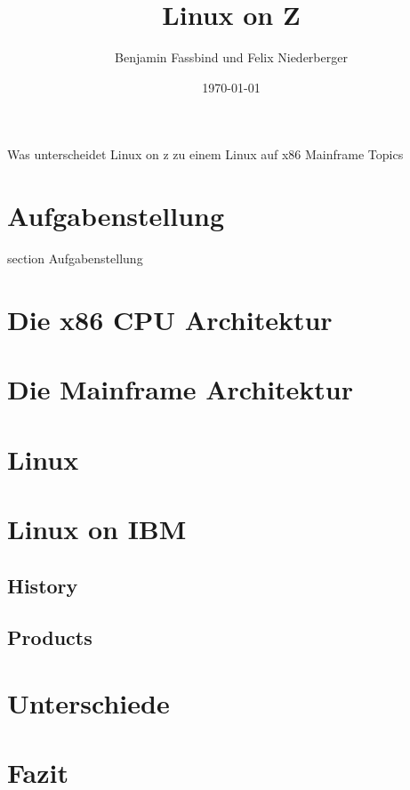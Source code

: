 \documentclass[oneside]{modern}
\title{Linux on Z}
\author{Benjamin Fassbind und Felix Niederberger}
\date{\today}
\begin{document}
   
   \renewcommand{\thesection}{\arabic{section}}

  \nocite{*}

  \firstpage
    {Was unterscheidet Linux on z zu einem Linux auf x86}
    {Mainframe Topics}
    {\theauthor}

  \addtableofcontents

  \newpage
  
  \section*{Aufgabenstellung}
    {section}
    {Aufgabenstellung}
  
  
  
  \section{Die x86 CPU Architektur}
  
  \section{Die Mainframe Architektur}
  \section{Linux}
  
  \section{Linux on IBM}
  \subsection{History}
  \subsection{Products}
  \section{Unterschiede}
  \section{Fazit}
\end{document}
